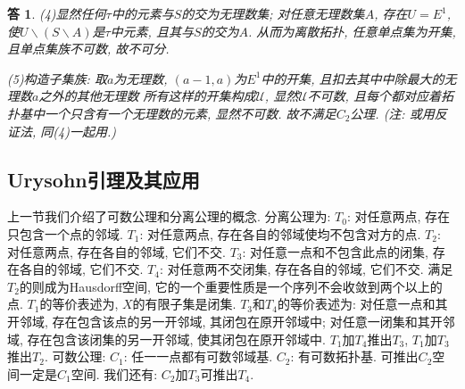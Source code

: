 \documentclass{ctexart}%
\newtheorem*{solution}{答}
\theoremstyle{definition}
\theoremstyle{remark}
\begin{document}
\begin{solution}
(4)显然任何$\tau$中的元素与$S$的交为无理数集; 对任意无理数集$A$, 存在$U=E^1$, 使$U\backslash (S\backslash A)$是$\tau$中元素, 且其与$S$的交为$A$. 从而为离散拓扑, 任意单点集为开集, 且单点集族不可数, 故不可分. 

(5)构造子集族: 取$a$为无理数, $(a-1,a)$为$E^1$中的开集, 且扣去其中中除最大的无理数$a$之外的其他无理数
所有这样的开集构成$\mathscr{U}$, 显然$\mathscr{U}$不可数, 且每个都对应着拓扑基中一个只含有一个无理数的元素, 显然不可数. 故不满足$C_2$公理. (注: 或用反证法, 同(4)一起用.)
\end{solution}

\subsection{Urysohn引理及其应用}

上一节我们介绍了可数公理和分离公理的概念. 分离公理为: $T_0$: 对任意两点, 存在只包含一个点的邻域. $T_1$: 对任意两点, 存在各自的邻域使均不包含对方的点. $T_2$: 对任意两点, 存在各自的邻域, 它们不交. $T_3$: 对任意一点和不包含此点的闭集, 存在各自的邻域, 它们不交. $T_4$: 对任意两不交闭集, 存在各自的邻域, 它们不交. 满足$T_2$的则成为Hausdorff空间, 它的一个重要性质是一个序列不会收敛到两个以上的点. $T_1$的等价表述为, $X$的有限子集是闭集. $T_3$和$T_4$的等价表述为: 对任意一点和其开邻域, 存在包含该点的另一开邻域, 其闭包在原开邻域中; 对任意一闭集和其开邻域, 存在包含该闭集的另一开邻域, 使其闭包在原开邻域中. $T_1$加$T_4$推出$T_3$, $T_1$加$T_3$推出$T_2$. 可数公理: $C_1$: 任一一点都有可数邻域基. $C_2$: 有可数拓扑基. 可推出$C_2$空间一定是$C_1$空间. 我们还有: $C_2$加$T_3$可推出$T_4$. 
\end{document}
